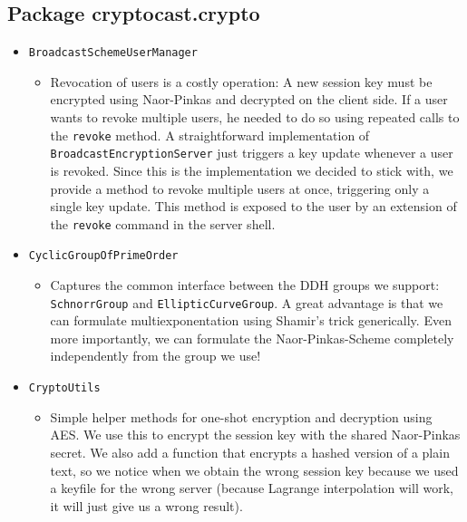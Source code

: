 \documentclass[a4paper,10pt]{scrartcl}
\begin{document}
\subsection{Package cryptocast.crypto}

\begin{itemize}
   \item \lstinline|BroadcastSchemeUserManager|
	 \begin{itemize}
	 	 \item Revocation of users is a costly operation: A new session key must be encrypted
		 using Naor-Pinkas and decrypted on the client side. If a user wants to revoke multiple
		 users, he needed to do so using repeated calls to the \lstinline|revoke| method.
		 A straightforward implementation of \lstinline|BroadcastEncryptionServer| just triggers
		 a key update whenever a user is revoked. Since this is the implementation we decided to
		 stick with, we provide a method to revoke multiple users at once, triggering only
		 a single key update. This method is exposed to the user by an extension of the \lstinline|revoke| command
		 in the server shell.
	\end{itemize}

   \item \lstinline|CyclicGroupOfPrimeOrder|
  \begin{itemize}
		\item Captures the common interface between the DDH groups we support:
	 \lstinline|SchnorrGroup| and \lstinline|EllipticCurveGroup|. A great advantage
	 is that we can formulate multiexponentation using Shamir's trick generically. Even more importantly,
	 we can formulate the Naor-Pinkas-Scheme completely independently from the group we use!
  \end{itemize}

   \item \lstinline|CryptoUtils|
  \begin{itemize}
   \item Simple helper methods for one-shot encryption and decryption using AES. We use this
	 to encrypt the session key with the shared Naor-Pinkas secret. We also add a function that
	 encrypts a hashed version of a plain text, so we notice when we obtain the wrong session
	 key because we used a keyfile for the wrong server (because Lagrange interpolation will work,
	 it will just give us a wrong result).
  \end{itemize}


\end{itemize}
\end{document}
